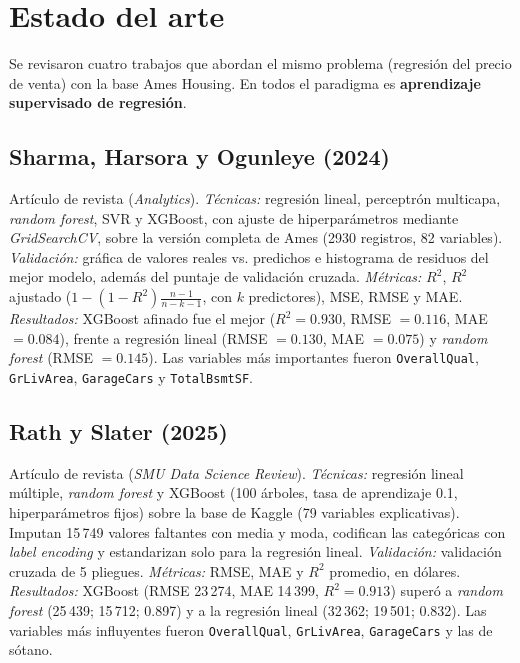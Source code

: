 \documentclass[journal]{IEEEtran}
\begin{document}
\section{Estado del arte}
Se revisaron cuatro trabajos que abordan el mismo problema (regresión del precio de venta) con la base Ames Housing. En todos el paradigma es \textbf{aprendizaje supervisado de regresión}.

\subsection{Sharma, Harsora y Ogunleye (2024) \cite{sharma2024}}
Artículo de revista (\textit{Analytics}). \textit{Técnicas:} regresión lineal, perceptrón multicapa, \textit{random forest}, SVR y XGBoost, con ajuste de hiperparámetros mediante \textit{GridSearchCV}, sobre la versión completa de Ames (2930 registros, 82 variables). \textit{Validación:} gráfica de valores reales vs. predichos e histograma de residuos del mejor modelo, además del puntaje de validación cruzada. \textit{Métricas:} $R^2$, $R^2$ ajustado ($1-(1-R^2)\frac{n-1}{n-k-1}$, con $k$ predictores), MSE, RMSE y MAE. \textit{Resultados:} XGBoost afinado fue el mejor ($R^2=0.930$, RMSE $=0.116$, MAE $=0.084$), frente a regresión lineal (RMSE $=0.130$, MAE $=0.075$) y \textit{random forest} (RMSE $=0.145$). Las variables más importantes fueron \texttt{OverallQual}, \texttt{GrLivArea}, \texttt{GarageCars} y \texttt{TotalBsmtSF}.

\subsection{Rath y Slater (2025) \cite{rath2025}}
Artículo de revista (\textit{SMU Data Science Review}). \textit{Técnicas:} regresión lineal múltiple, \textit{random forest} y XGBoost (100 árboles, tasa de aprendizaje 0.1, hiperparámetros fijos) sobre la base de Kaggle (79 variables explicativas). Imputan 15\,749 valores faltantes con media y moda, codifican las categóricas con \textit{label encoding} y estandarizan solo para la regresión lineal. \textit{Validación:} validación cruzada de 5 pliegues. \textit{Métricas:} RMSE, MAE y $R^2$ promedio, en dólares. \textit{Resultados:} XGBoost (RMSE 23\,274, MAE 14\,399, $R^2=0.913$) superó a \textit{random forest} (25\,439; 15\,712; 0.897) y a la regresión lineal (32\,362; 19\,501; 0.832). Las variables más influyentes fueron \texttt{OverallQual}, \texttt{GrLivArea}, \texttt{GarageCars} y las de sótano.
\end{document}
